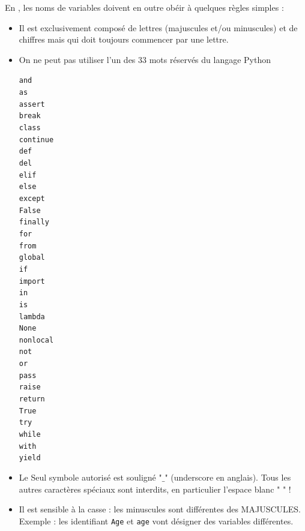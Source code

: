\begin{important}
	En \py, les noms de variables doivent en outre obéir à quelques règles simples :\\
	\begin{itemize}
		\item Il est exclusivement composé de lettres (majuscules  et/ou minuscules) et de chiffres mais qui doit toujours	commencer par une lettre.
		\item On ne peut pas utiliser l’un des 33 mots réservés du langage Python
		\begin{multicols}{7}
			\lstinline{and}\\      \lstinline{as}\\         \lstinline{assert}\\      \lstinline{break}\\       \lstinline{class}\\       \lstinline{continue}\\       \lstinline{def}\\
			\lstinline{del}\\       \lstinline{elif}\\       \lstinline{else}\\        \lstinline{except}\\      \lstinline{False}\\       \lstinline{finally}\\        \lstinline{for}\\
			\lstinline{from}\\      \lstinline{global}\\     \lstinline{if}\\          \lstinline{import}\\      \lstinline{in}\\          \lstinline{is}\\             \lstinline{lambda}\\
			\lstinline{None}\\      \lstinline{nonlocal}\\   \lstinline{not}\\         \lstinline{or}\\          \lstinline{pass}\\        \lstinline{raise}\\          \lstinline{return}\\
			\lstinline{True}\\      \lstinline{try}\\        \lstinline{while}\\     \lstinline{with}\\ \lstinline{yield}
		\end{multicols}	
		\item Le Seul symbole autorisé est souligné "$\_$" (underscore en anglais).
		Tous les autres caractères spéciaux sont interdits, en particulier l’espace blanc " " !
		\item Il est sensible à la casse : les minuscules sont différentes des MAJUSCULES. Exemple : les identifiant \lstinline{Age} et \lstinline{age} vont désigner des variables différentes.
	\end{itemize}
\end{important}

